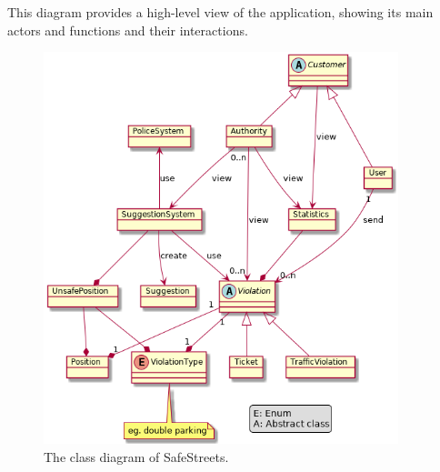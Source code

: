 This diagram provides a high-level view of the application, showing its main actors and functions and their interactions.
\begin{figure}[htp]
	\centering
	\includegraphics[width=0.92\textwidth]{images/Class Diagram.png}
	\caption{The class diagram of SafeStreets.}
	\label{fig:class-diagram}
\end{figure}
\clearpage